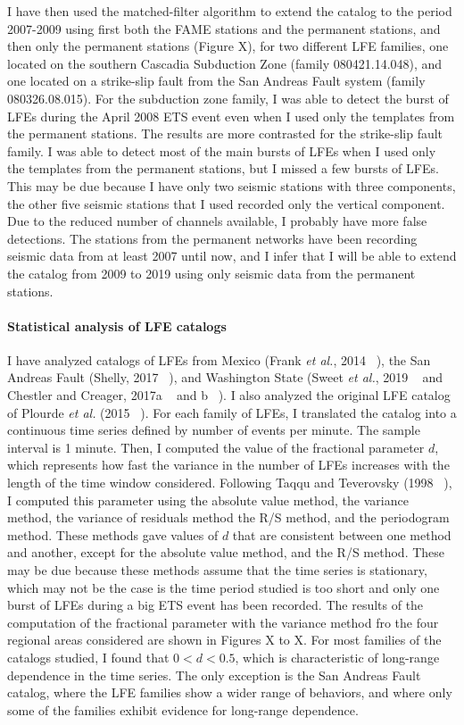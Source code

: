 \documentclass[letterpaper, 12pt]{article}
\begin{document}
I have then used the matched-filter algorithm to extend the catalog to the period 2007-2009 using first both the FAME stations and the permanent stations, and then only the permanent stations (Figure X), for two different LFE families, one located on the southern Cascadia Subduction Zone (family 080421.14.048), and one located on a strike-slip fault from the San Andreas Fault system (family 080326.08.015). For the subduction zone family, I was able to detect the burst of LFEs during the April 2008 ETS event even when I used only the templates from the permanent stations. The results are more contrasted for the strike-slip fault family. I was able to detect most of the main bursts of LFEs when I used only the templates from the permanent stations, but I missed a few bursts of LFEs. This may be due because I have only two seismic stations with three components, the other five seismic stations that I used recorded only the vertical component. Due to the reduced number of channels available, I probably have more false detections. The stations from the permanent networks have been recording seismic data from at least 2007 until now, and I infer that I will be able to extend the catalog from 2009 to 2019 using only seismic data from the permanent stations.

\paragraph{Statistical analysis of LFE catalogs} I have analyzed catalogs of LFEs from Mexico (Frank \textit{et al.}, 2014 ~\cite{FRA_2014}), the San Andreas Fault (Shelly, 2017 ~\cite{SHE_2017}), and Washington State (Sweet \textit{et al.}, 2019 ~\cite{SWE_2019} and Chestler and Creager, 2017a ~\cite{CHE_2017_JGR} and b ~\cite{CHE_2017_G3}). I also analyzed the original LFE catalog of Plourde \textit{et al.} (2015 ~\cite{PLO_2015}). For each family of LFEs, I translated the catalog into a continuous time series defined by number of events per minute. The sample interval is 1 minute. Then, I computed the value of the fractional parameter $d$, which represents how fast the variance in the number of LFEs increases with the length of the time window considered. Following Taqqu and Teverovsky (1998 ~\cite{TAQ_1998}), I computed this parameter using the absolute value method, the variance method, the variance of residuals method the R/S method, and the periodogram method. These methods gave values of $d$ that are consistent between one method and another, except for the absolute value method, and the R/S method. These may be due because these methods assume that the time series is stationary, which may not be the case is the time period studied is too short and only one burst of LFEs during a big ETS event has been recorded. The results of the computation of the fractional parameter with the variance method fro the four regional areas considered are shown in Figures X to X. For most families of the catalogs studied, I found that $0 < d < 0.5$, which is characteristic of long-range dependence in the time series. The only exception is the San Andreas Fault catalog, where the LFE families show a wider range of behaviors, and where only some of the families exhibit evidence for long-range dependence.
\end{document}
